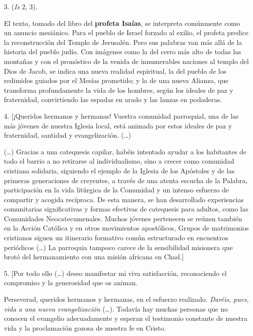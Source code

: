 \begin{body}
	3.  (\emph{Is} 2, 3). 
	
	El texto, tomado del libro del \textbf{profeta Isaías}, se interpreta comúnmente como un anuncio mesiánico. Para el pueblo de Israel forzado al exilio, el profeta predice la reconstrucción del Templo de Jerusalén. Pero sus palabras van más allá de la historia del pueblo judío. Con imágenes como la del cerro más alto de todas las montañas y con el pronóstico de la venida de innumerables naciones al templo del Dios de Jacob, se indica una nueva realidad espiritual, la del pueblo de los redimidos guiados por el Mesías prometido; y la de una nueva Alianza, que transforma profundamente la vida de los hombres, según los ideales de paz y fraternidad, convirtiendo las espadas en arado y las lanzas en podaderas. 
	
	4. {[}¡Queridos hermanos y hermanas! Vuestra comunidad parroquial, una de las más jóvenes de nuestra Iglesia local, está animada por estos ideales de paz y fraternidad, santidad y evangelización. (\ldots{}) 
	
	(\ldots{}) Gracias a una catequesis capilar, habéis intentado ayudar a los habitantes de todo el barrio a no retirarse al individualismo, sino a crecer como comunidad cristiana solidaria, siguiendo el ejemplo de la Iglesia de los Apóstoles y de las primeras generaciones de creyentes, a través de una atenta escucha de la Palabra, participación en la vida litúrgica de la Comunidad y un intenso esfuerzo de compartir y acogida recíproca. De esta manera, se han desarrollado experiencias comunitarias significativas y formas efectivas de catequesis para adultos, como las Comunidades Neocatecumenales. Muchos jóvenes pertenecen se reúnen también en la Acción Católica y en otros movimientos apostólicos, Grupos de matrimonios cristianos siguen un itinerario formativo común estructurado en encuentros periódicos (\ldots{}) La parroquia tampoco carece de la sensibilidad misionera que brotó del hermanamiento con una misión africana en Chad.{]}
	
	5. {[}Por todo ello (\ldots{}) deseo manifestar mi viva satisfacción, reconociendo el compromiso y la generosidad que os animan. 
	
	Perseverad, queridos hermanos y hermanas, en el esfuerzo realizado. \emph{Daréis, pues, vida a una nueva evangelización} (\ldots{}). Todavía hay muchas personas que no conocen el evangelio adecuadamente y esperan el testimonio constante de nuestra vida y la proclamación gozosa de nuestra fe en Cristo. 
	

\end{body}
